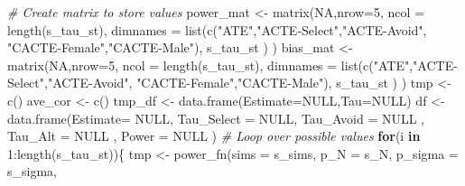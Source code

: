 \documentclass[
]{article}
\newenvironment{Shaded}{\begin{snugshade}}{\end{snugshade}}
\newcommand{\AttributeTok}[1]{\textcolor[rgb]{0.77,0.63,0.00}{#1}}
\newcommand{\CommentTok}[1]{\textcolor[rgb]{0.56,0.35,0.01}{\textit{#1}}}
\newcommand{\ConstantTok}[1]{\textcolor[rgb]{0.00,0.00,0.00}{#1}}
\newcommand{\ControlFlowTok}[1]{\textcolor[rgb]{0.13,0.29,0.53}{\textbf{#1}}}
\newcommand{\DecValTok}[1]{\textcolor[rgb]{0.00,0.00,0.81}{#1}}
\newcommand{\FunctionTok}[1]{\textcolor[rgb]{0.00,0.00,0.00}{#1}}
\newcommand{\NormalTok}[1]{#1}
\newcommand{\OtherTok}[1]{\textcolor[rgb]{0.56,0.35,0.01}{#1}}
\newcommand{\SpecialCharTok}[1]{\textcolor[rgb]{0.00,0.00,0.00}{#1}}
\newcommand{\StringTok}[1]{\textcolor[rgb]{0.31,0.60,0.02}{#1}}
\begin{document}
\begin{Shaded}
\begin{Highlighting}[]
  \CommentTok{\# Create matrix to store values}
\NormalTok{  power\_mat }\OtherTok{\textless{}{-}} \FunctionTok{matrix}\NormalTok{(}\ConstantTok{NA}\NormalTok{,}\AttributeTok{nrow=}\DecValTok{5}\NormalTok{, }\AttributeTok{ncol =} \FunctionTok{length}\NormalTok{(s\_tau\_st),}
                      \AttributeTok{dimnames =} \FunctionTok{list}\NormalTok{(}\FunctionTok{c}\NormalTok{(}\StringTok{"ATE"}\NormalTok{,}\StringTok{"ACTE{-}Select"}\NormalTok{,}\StringTok{"ACTE{-}Avoid"}\NormalTok{,}
                                        \StringTok{"CACTE{-}Female"}\NormalTok{,}\StringTok{"CACTE{-}Male"}\NormalTok{),}
\NormalTok{                                      s\_tau\_st}
\NormalTok{                      )}
\NormalTok{  )}
\NormalTok{  bias\_mat }\OtherTok{\textless{}{-}} \FunctionTok{matrix}\NormalTok{(}\ConstantTok{NA}\NormalTok{,}\AttributeTok{nrow=}\DecValTok{5}\NormalTok{, }\AttributeTok{ncol =} \FunctionTok{length}\NormalTok{(s\_tau\_st),}
                     \AttributeTok{dimnames =} \FunctionTok{list}\NormalTok{(}\FunctionTok{c}\NormalTok{(}\StringTok{"ATE"}\NormalTok{,}\StringTok{"ACTE{-}Select"}\NormalTok{,}\StringTok{"ACTE{-}Avoid"}\NormalTok{,}
                                       \StringTok{"CACTE{-}Female"}\NormalTok{,}\StringTok{"CACTE{-}Male"}\NormalTok{),}
\NormalTok{                                     s\_tau\_st}
\NormalTok{                     )}
\NormalTok{  )}
\NormalTok{  tmp }\OtherTok{\textless{}{-}} \FunctionTok{c}\NormalTok{()}
\NormalTok{  ave\_cor }\OtherTok{\textless{}{-}} \FunctionTok{c}\NormalTok{()}
\NormalTok{  tmp\_df }\OtherTok{\textless{}{-}} \FunctionTok{data.frame}\NormalTok{(}\AttributeTok{Estimate=}\ConstantTok{NULL}\NormalTok{,}\AttributeTok{Tau=}\ConstantTok{NULL}\NormalTok{)}
\NormalTok{  df }\OtherTok{\textless{}{-}} \FunctionTok{data.frame}\NormalTok{(}\AttributeTok{Estimate=} \ConstantTok{NULL}\NormalTok{,}
                   \AttributeTok{Tau\_Select =} \ConstantTok{NULL}\NormalTok{, }
                   \AttributeTok{Tau\_Avoid =} \ConstantTok{NULL}\NormalTok{ ,}
                   \AttributeTok{Tau\_Alt =} \ConstantTok{NULL}\NormalTok{ ,}
                   \AttributeTok{Power =} \ConstantTok{NULL}\NormalTok{ )}
  \CommentTok{\# Loop over possible values}
  \ControlFlowTok{for}\NormalTok{(i }\ControlFlowTok{in} \DecValTok{1}\SpecialCharTok{:}\FunctionTok{length}\NormalTok{(s\_tau\_st))\{}
\NormalTok{    tmp }\OtherTok{\textless{}{-}} \FunctionTok{power\_fn}\NormalTok{(}\AttributeTok{sims =}\NormalTok{ s\_sims, }
                    \AttributeTok{p\_N =}\NormalTok{ s\_N,}
                    \AttributeTok{p\_sigma  =}\NormalTok{ s\_sigma,}

\end{Highlighting}
\end{Shaded}
\end{document}
